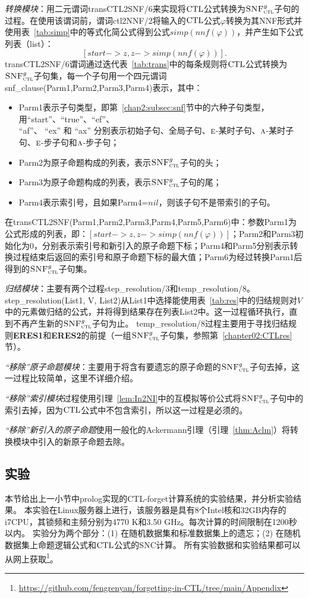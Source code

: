 {\em 转换模块}：用二元谓词transCTL2SNF/6来实现将$\textrm{CTL}$公式转换为${\textsc{SNF}_{\textsc{ctl}}^g}$子句的过程。在使用该谓词前，谓词ctl2NNF/2将输入的$\textrm{CTL}$公式$\varphi$转换为其NNF形式并使用表~\ref{tab:simp}中的等式化简公式得到公式$simp(nnf(\varphi))$，并产生如下公式列表（list）：
$$[start-> z, z -> simp(nnf(\varphi))].$$
transCTL2SNF/6谓词通过迭代表~\ref{tab:trans}中的每条规则将$\textrm{CTL}$公式转换为${\textsc{SNF}_{\textsc{ctl}}^g}$子句集，每一个子句用一个四元谓词snf\_clause(Parm1,Parm2,Parm3,Parm4)表示，其中：
\begin{itemize}
	\item Parm1表示子句类型，即第~\ref{chap2:subsec:snf}节中的六种子句类型，用“start”、“true”、“ef”、\\“af”、 “ex” 和 “ax” 分别表示初始子句、全局子句、$\textsc{e}$-某时子句、$\textsc{a}$-某时子句、$\textsc{e}$-步子句和$\textsc{a}$-步子句；
	\item Parm2为原子命题构成的列表，表示${\textsc{SNF}_{\textsc{ctl}}^g}$子句的头；
	\item Parm3为原子命题构成的列表，表示${\textsc{SNF}_{\textsc{ctl}}^g}$子句的尾；
	\item Parm4表示索引号，且如果Parm4=$nil$，则该子句不是带索引的子句。
\end{itemize}

在transCTL2SNF(Parm1,Parm2,Parm3,Parm4,Parm5,Parm6)中：参数Parm1为公式形成的列表，即：$[start-> z, z -> simp(nnf(\varphi))]$；Parm2和Parm3初始化为0，分别表示索引号和新引入的原子命题下标；Parm4和Parm5分别表示转换过程结束后返回的索引号和原子命题下标的最大值；Parm6为经过转换Parm1后得到的${\textsc{SNF}_{\textsc{ctl}}^g}$子句集。


{\em 归结模块}：主要有两个过程step\_resolution/3和temp\_resolution/8。step\_resolution(List1, V, List2)从List1中选择能使用表~\ref{tab:res}中的归结规则对$V$中的元素做归结的公式，并将得到结果存在列表List2中。这一过程循环执行，直到不再产生新的${\textsc{SNF}_{\textsc{ctl}}^g}$子句为止。
temp\_resolution/8过程主要用于寻找归结规则\textbf{ERES1}和\textbf{ERES2}的前提（一组${\textsc{SNF}_{\textsc{ctl}}^g}$子句集，参照第~\ref{chapter02:CTLres}节）。

{\em “移除”原子命题模块}：主要用于将含有要遗忘的原子命题的${\textsc{SNF}_{\textsc{ctl}}^g}$子句去掉，这一过程比较简单，这里不详细介绍。

{\em “移除”索引模块}过程使用引理~\ref{lem:In2NI}中的互模拟等价公式将${\textsc{SNF}_{\textsc{ctl}}^g}$子句中的索引去掉，因为$\textrm{CTL}$公式中不包含索引，所以这一过程是必须的。

{\em “移除”新引入的原子命题}使用一般化的Ackermann引理（引理~\ref{thm:Aclm}）将转换模块中引入的新原子命题去除。


\subsection{实验}\label{cha5:subsec:expriment}
本节给出上一小节中prolog实现的CTL-forget计算系统的实验结果，并分析实验结果。
本实验在Linux服务器上进行，该服务器是具有8个Intel核和32GB内存的i7CPU，其锁频和主频分别为4770 K和3.50 GHz。每次计算的时间限制在1200秒以内。
	实验分为两个部分：(1) 在随机数据集和标准数据集上的遗忘；(2) 在随机数据集上命题逻辑公式和$\textrm{CTL}$公式的SNC计算。
	所有实验数据和实验结果都可以从网上获取\footnote{ \url{https://github.com/fengrenyan/forgetting-in-CTL/tree/main/Appendix}}。
	
